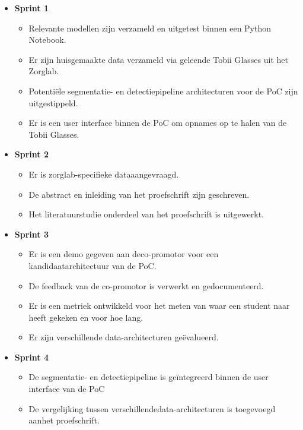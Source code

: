 \begin{itemize}
    \item \textbf{Sprint 1}
        \begin{itemize}
            \item Relevante modellen zijn verzameld en uitgetest binnen een Python Notebook.
            \item Er zijn huisgemaakte data verzameld via geleende Tobii Glasses uit het Zorglab.
            \item Potentiële segmentatie- en detectiepipeline architecturen voor de PoC zijn uitgestippeld.
            \item Er is een user interface binnen de PoC om opnames op te halen van de Tobii Glasses.
        \end{itemize}
    \item \textbf{Sprint 2}
        \begin{itemize}
            \item Er is zorglab-specifieke data\newline aangevraagd.
            \item De abstract en inleiding van het proefschrift zijn geschreven.
            \item Het literatuurstudie onderdeel van het proefschrift is uitgewerkt.
        \end{itemize}
        \item \textbf{Sprint 3}
        \begin{itemize}
            \item Er is een demo gegeven aan de\newline co-promotor voor een kandidaat\newline architectuur van de PoC.
            \item De feedback van de co-promotor is verwerkt en gedocumenteerd.
            \item Er is een metriek ontwikkeld voor het meten van waar een student naar heeft gekeken en voor hoe lang.
            \item Er zijn verschillende data-architecturen geëvalueerd.
        \end{itemize}
    \item \textbf{Sprint 4}
        \begin{itemize}
            \item De segmentatie- en detectiepipeline is geïntegreerd binnen de user interface van de PoC
            \item De vergelijking tussen verschillende\newline data-architecturen is toegevoegd aan\newline het proefschrift.

\end{itemize}
\end{itemize}
